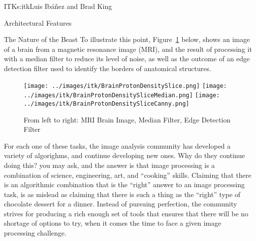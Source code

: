 \begin{aosachapter}{ITK}{s:itk}{Luis Ib\'{a}\~{n}ez and Brad King}
\begin{aosasect1}{Architectural Features}
\begin{aosasect2}{The Nature of the Beast}
To illustrate this point, Figure~\ref{fig.itk.brim} below, shows an image of a
brain from a magnetic resonance image (MRI), and the result of processing it
with a median filter to reduce its level of noise, as well as the outcome of an
edge detection filter used to identify the borders of anatomical structures.



%
%
%
\begin{figure}[h!]
\centering
\texttt{[image: ../images/itk/BrainProtonDensitySlice.png]}
\texttt{[image: ../images/itk/BrainProtonDensitySliceMedian.png]}
\texttt{[image: ../images/itk/BrainProtonDensitySliceCanny.png]}
\caption{From left to right: MRI Brain Image, Median Filter, Edge Detection Filter}
\label{fig.itk.brim}
\end{figure}

For each one of these tasks, the image analysis community has developed a
variety of algorighms, and continue developing new ones. Why do they continue
doing this? you may ask, and the answer is that image processing is a
combination of science, engineering, art, and ``cooking'' skills. Claiming that
there is an algorithmic combination that is the ``right'' answer to an image
processing task, is as mislead as claiming that there is such a thing as the
``right'' type of chocolate dessert for a dinner. Instead of pursuing
perfection, the community strives for producing a rich enough set of tools that
ensures that there will be no shortage of options to try, when it comes the
time to face a given image processing challenge.


\end{aosasect2}
\end{aosasect1}
\end{aosachapter}
